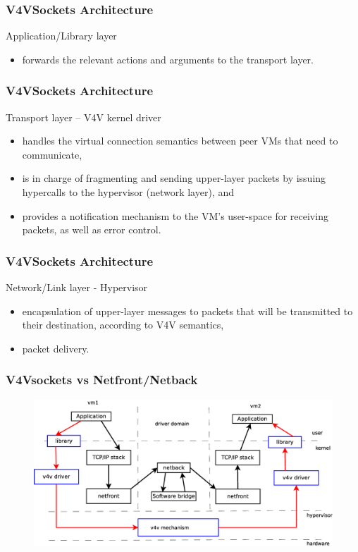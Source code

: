 \documentclass[red,slidestop,notes,compress,mathserif]{beamer}
\begin{document}
\begin{frame}
\frametitle{V4VSockets Architecture}
\begin{block}{Application/Library layer}
\begin{itemize}
\item forwards the relevant actions and arguments to the transport layer.
\end{itemize}
\end{block}
\end{frame}

\begin{frame}
\frametitle{V4VSockets Architecture}
\begin{block}{Transport layer -- V4V kernel driver}
\begin{itemize}
\item handles the virtual connection semantics between peer VMs that need to communicate,
\item is in charge of fragmenting and sending upper-layer packets by issuing hypercalls to the hypervisor (network layer), and
\item provides a notification mechanism to the VM's user-space for receiving packets, as well as error control.
\end{itemize}
\end{block}
\end{frame}

\begin{frame}
\frametitle{V4VSockets Architecture}
\begin{block}{Network/Link layer - Hypervisor}
\begin{itemize} 
\item encapsulation of upper-layer messages to packets that will be transmitted
to their destination, according to V4V semantics,
\item packet delivery.
\end{itemize}
\end{block}
\end{frame}

\begin{frame}
\frametitle{V4Vsockets vs Netfront/Netback}
\begin{figure}
\includegraphics[width=\textwidth]{figures/paths.eps}
\end{figure}
\end{frame}
\end{document}
